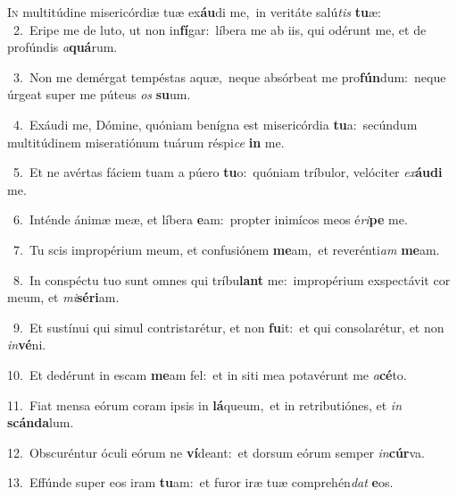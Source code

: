 \lettrine{\initial\textcolor{\initialcolor}{I}}{n} multitúdine misericórdiæ tuæ ex\-\textbf{áu}\-di me,~\star in veritáte salú\textit{tis} \textbf{tu}\-æ:\\
{\numbfont\textcolor{\numbcolor}{~2.}}~Eripe me de luto, ut non in\-\textbf{fí}\-gar:~\star líbera me ab iis, qui odérunt me, et de profúndis \textit{a}\-\textbf{quá}rum.\par
{\numbfont\textcolor{\numbcolor}{~3.}}~Non me demérgat tempéstas aquæ,~\dagger neque absórbeat me pro\-\textbf{fún}\-dum:~\star neque úrgeat super me púteus \textit{os} \textbf{su}\-um.\par
{\numbfont\textcolor{\numbcolor}{~4.}}~Exáudi me, Dómine, quóniam benígna est misericórdia \textbf{tu}\-a:~\star secúndum multitúdinem miseratiónum tuárum réspi\textit{ce} \textbf{in} me.\par
{\numbfont\textcolor{\numbcolor}{~5.}}~Et ne avértas fáciem tuam a púero \textbf{tu}\-o:~\star quóniam tríbulor, velóciter \textit{ex}\-\textbf{áu}\textbf{di} me.\par
{\numbfont\textcolor{\numbcolor}{~6.}}~Inténde ánimæ meæ, et líbera \textbf{e}\-am:~\star propter inimícos meos é\-\textit{ri}\-\textbf{pe} me.\par
{\numbfont\textcolor{\numbcolor}{~7.}}~Tu scis impropérium meum, et confusiónem \textbf{me}\-am,~\star et reverénti\textit{am} \textbf{me}\-am.\par
{\numbfont\textcolor{\numbcolor}{~8.}}~In conspéctu tuo sunt omnes qui tríbu\textbf{lant} me:~\star impropérium exspectávit cor meum, et \textit{mi}\-\textbf{sé}\textbf{ri}am.\par
{\numbfont\textcolor{\numbcolor}{~9.}}~Et sustínui qui simul contristarétur, et non \textbf{fu}\-it:~\star et qui consolarétur, et non \textit{in}\-\textbf{vé}ni.\par
{\numbfont\textcolor{\numbcolor}{10.}}~Et dedérunt in escam \textbf{me}\-am fel:~\star et in siti mea potavérunt me \textit{a}\-\textbf{cé}to.\par
{\numbfont\textcolor{\numbcolor}{11.}}~Fiat mensa eórum coram ipsis in \textbf{lá}\-queum,~\star et in retributiónes, et \textit{in} \textbf{scán}\-\textbf{da}lum.\par
{\numbfont\textcolor{\numbcolor}{12.}}~Obscuréntur óculi eórum ne \textbf{ví}\-deant:~\star et dorsum eórum semper \textit{in}\-\textbf{cúr}va.\par
{\numbfont\textcolor{\numbcolor}{13.}}~Effúnde super eos iram \textbf{tu}\-am:~\star et furor iræ tuæ comprehén\textit{dat} \textbf{e}\-os.\par
